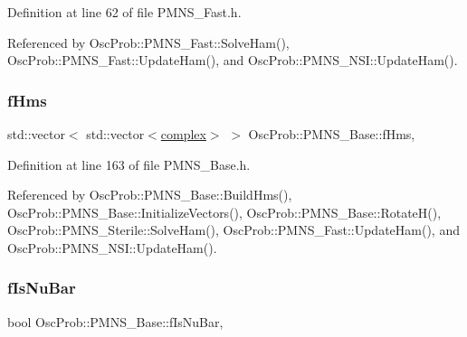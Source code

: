 Definition at line 62 of file P\+M\+N\+S\+\_\+\+Fast.\+h.



Referenced by Osc\+Prob\+::\+P\+M\+N\+S\+\_\+\+Fast\+::\+Solve\+Ham(), Osc\+Prob\+::\+P\+M\+N\+S\+\_\+\+Fast\+::\+Update\+Ham(), and Osc\+Prob\+::\+P\+M\+N\+S\+\_\+\+N\+S\+I\+::\+Update\+Ham().

\mbox{\label{classOscProb_1_1PMNS__Base_adf5901166216e8c7a5cff2092952f473}} 
\subsubsection{\texorpdfstring{f\+Hms}{fHms}}
{\footnotesize\ttfamily std\+::vector$<$ std\+::vector$<$\hyperlink{classOscProb_1_1PMNS__Base_ae86ec4718808ce9d02e5f5b4226714ab}{complex}$>$ $>$ Osc\+Prob\+::\+P\+M\+N\+S\+\_\+\+Base\+::f\+Hms\hspace{0.3cm}{\ttfamily [protected]}, {\ttfamily [inherited]}}



Definition at line 163 of file P\+M\+N\+S\+\_\+\+Base.\+h.



Referenced by Osc\+Prob\+::\+P\+M\+N\+S\+\_\+\+Base\+::\+Build\+Hms(), Osc\+Prob\+::\+P\+M\+N\+S\+\_\+\+Base\+::\+Initialize\+Vectors(), Osc\+Prob\+::\+P\+M\+N\+S\+\_\+\+Base\+::\+Rotate\+H(), Osc\+Prob\+::\+P\+M\+N\+S\+\_\+\+Sterile\+::\+Solve\+Ham(), Osc\+Prob\+::\+P\+M\+N\+S\+\_\+\+Fast\+::\+Update\+Ham(), and Osc\+Prob\+::\+P\+M\+N\+S\+\_\+\+N\+S\+I\+::\+Update\+Ham().

\mbox{\label{classOscProb_1_1PMNS__Base_a0ebaeaefab36a3ff381c6293faedfdd6}} 
\subsubsection{\texorpdfstring{f\+Is\+Nu\+Bar}{fIsNuBar}}
{\footnotesize\ttfamily bool Osc\+Prob\+::\+P\+M\+N\+S\+\_\+\+Base\+::f\+Is\+Nu\+Bar\hspace{0.3cm}{\ttfamily [protected]}, {\ttfamily [inherited]}}



